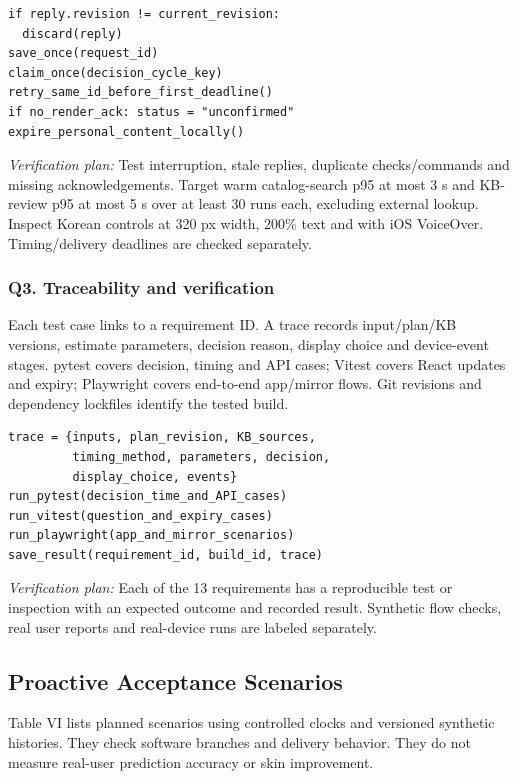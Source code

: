 \documentclass[conference,letterpaper]{IEEEtran}
\begin{document}
\begin{lstlisting}
if reply.revision != current_revision:
  discard(reply)
save_once(request_id)
claim_once(decision_cycle_key)
retry_same_id_before_first_deadline()
if no_render_ack: status = "unconfirmed"
expire_personal_content_locally()
\end{lstlisting}



\textit{Verification plan:} Test interruption, stale replies, duplicate checks/commands and missing acknowledgements. Target warm catalog-search p95 at most 3 s and KB-review p95 at most 5 s over at least 30 runs each, excluding external lookup. Inspect Korean controls at 320 px width, 200\% text and with iOS VoiceOver. Timing/delivery deadlines are checked separately.

\subsubsection*{Q3. Traceability and verification}

Each test case links to a requirement ID. A trace records input/plan/KB versions, estimate parameters, decision reason, display choice and device-event stages. pytest covers decision, timing and API cases; Vitest covers React updates and expiry; Playwright covers end-to-end app/mirror flows. Git revisions and dependency lockfiles identify the tested build.

\begin{lstlisting}
trace = {inputs, plan_revision, KB_sources,
         timing_method, parameters, decision,
         display_choice, events}
run_pytest(decision_time_and_API_cases)
run_vitest(question_and_expiry_cases)
run_playwright(app_and_mirror_scenarios)
save_result(requirement_id, build_id, trace)
\end{lstlisting}



\textit{Verification plan:} Each of the 13 requirements has a reproducible test or inspection with an expected outcome and recorded result. Synthetic flow checks, real user reports and real-device runs are labeled separately.

\subsection{Proactive Acceptance Scenarios}

Table VI lists planned scenarios using controlled clocks and versioned synthetic histories. They check software branches and delivery behavior. They do not measure real-user prediction accuracy or skin improvement.
\end{document}
